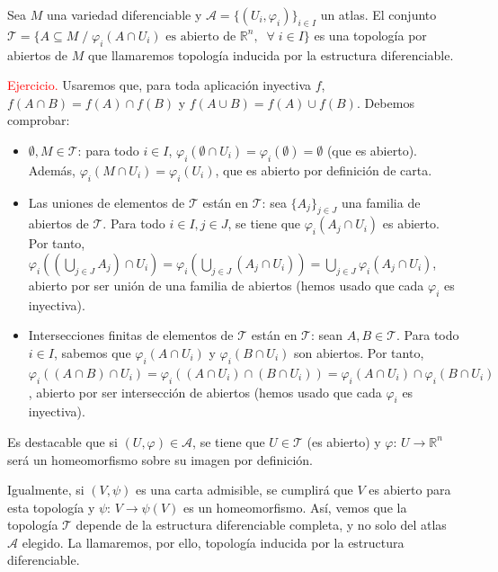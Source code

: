 \begin{prop}
Sea $M$ una variedad diferenciable y $\mathcal{A} = \{(U_i,\varphi_i)\}_{i\in I}$ un atlas. El conjunto $\mathcal{T} = \{A \subseteq M \;/\; \varphi_i(A\cap U_i) \text{ es abierto de } \mathbb{R}^n, \;\; \forall\; i \in I\}$ es una topología por abiertos de $M$ que llamaremos topolog\'ia inducida por la estructura diferenciable.
\end{prop}
\begin{demx} \textcolor{red}{Ejercicio.}
Usaremos que, para toda aplicación inyectiva $f$, $f(A\cap B) = f(A) \cap f(B)$ y $f(A \cup B) = f(A) \cup f(B)$. Debemos comprobar:
\begin{itemize}
    \item $\emptyset, M \in \mathcal{T}$: para todo $i \in I$, $\varphi_i(\emptyset \cap U_i) = \varphi_i(\emptyset) = \emptyset$ (que es abierto). Además, $\varphi_i(M \cap U_i) = \varphi_i(U_i)$, que es abierto por definición de carta.
    \item Las uniones de elementos de $\mathcal{T}$ están en $\mathcal T$:  sea $\{A_j\}_{j \in J}$ una familia de abiertos de $\mathcal{T}$. Para todo $i\in I, j \in J$, se tiene que $\varphi_i(A_j \cap U_i)$ es abierto. Por tanto, $\varphi_i((\underset{j\in J}{\bigcup} A_j) \cap U_i) = \varphi_i(\underset{j\in J}{\bigcup}(A_j \cap U_i)) = \underset{j\in J}{\bigcup}\varphi_i(A_j \cap U_i)$, abierto por ser unión de una familia de abiertos (hemos usado que cada $\varphi_i$ es inyectiva).
    \item Intersecciones finitas de elementos de $\mathcal{T}$ están en $\mathcal T$: sean $A, B \in \mathcal T$. Para todo $i \in I$, sabemos que $\varphi_i(A \cap U_i)$ y $\varphi_i(B \cap U_i)$ son abiertos. Por tanto, $\varphi_i((A \cap B) \cap U_i) = \varphi_i((A \cap U_i) \cap (B \cap U_i)) = \varphi_i(A \cap U_i) \cap \varphi_i(B \cap U_i)$, abierto por ser intersección de abiertos (hemos usado que cada $\varphi_i$ es inyectiva).
\end{itemize}
\end{demx}
\begin{obs} 
\justifying Es destacable que si $(U, \varphi) \in \mathcal A$, se tiene que $U\in \mathcal{T}$ (es abierto) y $\varphi:\,U\to \mathbb{R}^n$ será un homeomorfismo sobre su imagen por definición.

Igualmente, si $(V,\psi)$ es una carta admisible, se cumplirá que $V$ es abierto para esta topología y $\psi:\,V\longrightarrow \psi(V)$ es un homeomorfismo. Así, vemos que la topología $\mathcal T$ depende de la estructura diferenciable completa, y no solo del atlas $\mathcal A$ elegido. La llamaremos, por ello, topología inducida por la estructura diferenciable.
\end{obs}

